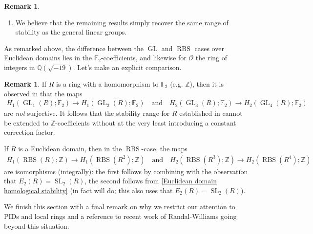 \documentclass[12pt, reqno]{amsart}
\theoremstyle{plain}
\theoremstyle{definition}
\newtheorem{remark}[theorem]{Remark}
\newcommand{\Z}{\mathbb Z}
\newcommand{\Q}{\mathbb Q}
\newcommand{\F}{\mathbb F}
\begin{document}
\begin{remark}
\begin{enumerate}
\item We believe that the remaining results simply recover the same range of stability as the general linear groups.\qedhere
\end{enumerate}
\end{remark}

As remarked above, the difference between the $\operatorname{GL}$ and $\operatorname{RBS}$ cases over Euclidean domains lies in the $\F_2$-coefficients, and likewise for $\mathcal{O}$ the ring of integers in $\Q(\sqrt{-19})$. Let's make an explicit comparison.

\begin{remark}\label{small degrees}
If $R$ is a ring with a homomorphism to $\F_2$ (e.g. $\Z$), then it is observed in \cite[Remark 6.6]{GalatiusKupersRandalWilliams18b} that the maps
\begin{align*}
H_1(\operatorname{GL}_1(R);\F_2)\rightarrow H_1(\operatorname{GL}_2(R);\F_2) \quad \text{and}\quad H_2(\operatorname{GL}_3(R);\F_2)\rightarrow H_2(\operatorname{GL}_4(R);\F_2)
\end{align*}
are \textit{not} surjective. It follows that the stability range for $R$ established in \cite{KupersMillerPatzt} cannot be extended to $\Z$-coefficients without at the very least introducing a constant correction factor.

If $R$ is a Euclidean domain, then in the $\operatorname{RBS}$-case, the maps
\begin{align*}
H_1(\operatorname{RBS}(R);\Z)\rightarrow H_1(\operatorname{RBS}(R^2);\Z) \quad \text{and}\quad H_2(\operatorname{RBS}(R^3);\Z)\rightarrow H_2(\operatorname{RBS}(R^4);\Z)
\end{align*}
are isomorphisms (integrally): the first follows by combining  with the observation that $E_2(R)=\operatorname{SL}_2(R)$, the second follows from \ref{Euclidean domain homological stability} (in fact  will do; this also uses that $E_2(R)=\operatorname{SL}_2(R)$).
\end{remark}

We finish this section with a final remark on why we restrict our attention to PIDs and local rings and a reference to recent work of Randal-Williams going beyond this situation.
\end{document}

